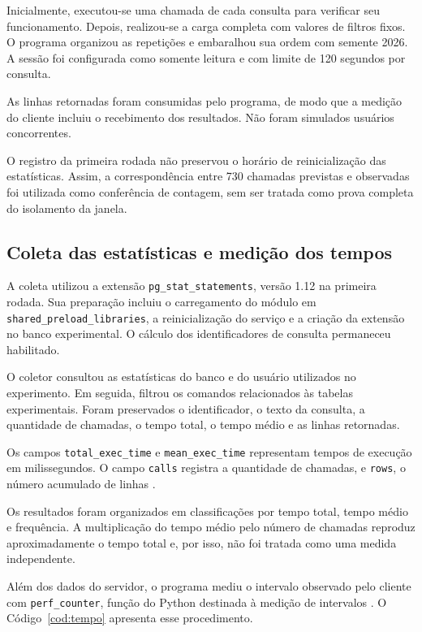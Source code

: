 \documentclass{UNESC}
\newcommand{\codigo}[1]{\texttt{#1}}
\begin{document}
Inicialmente, executou-se uma chamada de cada consulta para verificar seu funcionamento. Depois, realizou-se a carga completa com valores de filtros fixos. O programa organizou as repetições e embaralhou sua ordem com semente 2026. A sessão foi configurada como somente leitura e com limite de 120 segundos por consulta.

As linhas retornadas foram consumidas pelo programa, de modo que a medição do cliente incluiu o recebimento dos resultados. Não foram simulados usuários concorrentes.

O registro da primeira rodada não preservou o horário de reinicialização das estatísticas. Assim, a correspondência entre 730 chamadas previstas e observadas foi utilizada como conferência de contagem, sem ser tratada como prova completa do isolamento da janela.

\subsection{Coleta das estatísticas e medição dos tempos}

A coleta utilizou a extensão \codigo{pg\_stat\_statements}, versão 1.12 na primeira rodada. Sua preparação incluiu o carregamento do módulo em \codigo{shared\_preload\_libraries}, a reinicialização do serviço e a criação da extensão no banco experimental. O cálculo dos identificadores de consulta permaneceu habilitado.

O coletor consultou as estatísticas do banco e do usuário utilizados no experimento. Em seguida, filtrou os comandos relacionados às tabelas experimentais. Foram preservados o identificador, o texto da consulta, a quantidade de chamadas, o tempo total, o tempo médio e as linhas retornadas.

Os campos \codigo{total\_exec\_time} e \codigo{mean\_exec\_time} representam tempos de execução em milissegundos. O campo \codigo{calls} registra a quantidade de chamadas, e \codigo{rows}, o número acumulado de linhas \cite{postgresql2026pgstat}.

Os resultados foram organizados em classificações por tempo total, tempo médio e frequência. A multiplicação do tempo médio pelo número de chamadas reproduz aproximadamente o tempo total e, por isso, não foi tratada como uma medida independente.

Além dos dados do servidor, o programa mediu o intervalo observado pelo cliente com \codigo{perf\_counter}, função do Python destinada à medição de intervalos \cite{python2025time}. O Código~\ref{cod:tempo} apresenta esse procedimento.
\end{document}
